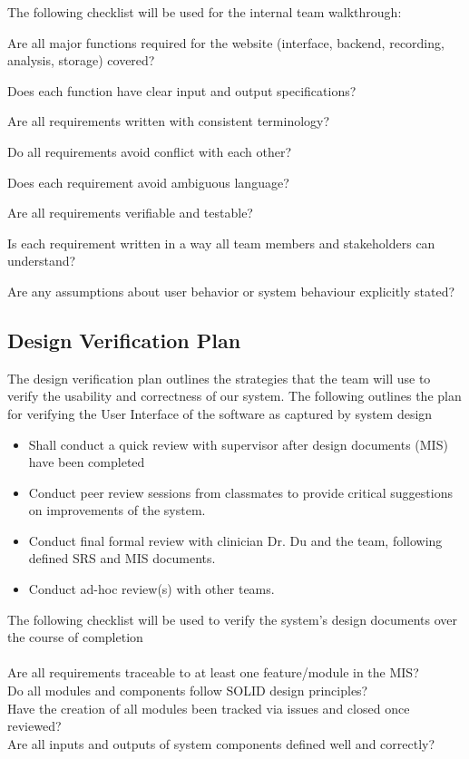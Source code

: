 \documentclass[12pt, titlepage]{article}
\newcommand{\checkbox}{\ding{113}} %
\begin{document}
The following checklist will be used for the internal team walkthrough: \\
\begin{todolist}
  \item Are all major functions required for the website (interface, backend, recording, analysis, storage) covered?
  \item Does each function have clear input and output specifications?
  \item Are all requirements written with consistent terminology?
  \item Do all requirements avoid conflict with each other?
  \item Does each requirement avoid ambiguous language?
  \item Are all requirements verifiable and testable?
  \item Is each requirement written in a way all team members and stakeholders can understand?
  \item Are any assumptions about user behavior or system behaviour explicitly stated?
\end{todolist}

\subsection{Design Verification Plan}


The design verification plan outlines the strategies that the team will use to verify the usability and correctness of our
 system. The following outlines the plan for verifying the User Interface of the software as captured by system design
\begin{itemize}
  \item Shall conduct a quick review with supervisor after design documents (MIS) have been completed 
  \item Conduct peer review sessions from classmates to provide critical suggestions on improvements of the system. 
  \item Conduct final formal review with clinician Dr. Du and the team, following defined SRS and MIS documents. 
  \item Conduct ad-hoc review(s) with other teams.
\end{itemize}

The following checklist will be used to verify the system's design documents over the course of completion \\\\
\checkbox Are all requirements traceable to at least one feature/module in the MIS? \\
\checkbox Do all modules and components follow SOLID design principles? \\
\checkbox Have the creation of all modules been tracked via issues and closed once reviewed? \\
\checkbox Are all inputs and outputs of system components defined well and correctly? \\
\end{document}

